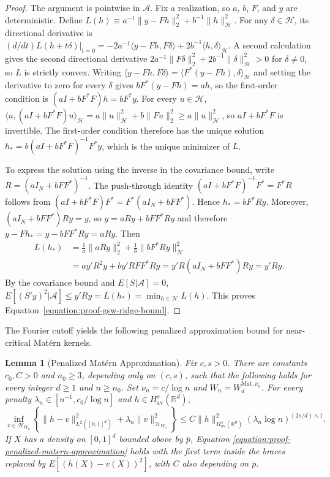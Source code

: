 \documentclass[letterpaper,12pt]{article}
\newtheorem{lem}[thm]{Lemma}
\theoremstyle{definition}
\numberwithin{equation}{section}
\newcommand{\mc}{\mathcal}
\newcommand{\norm}[1]{\lVert#1\rVert}
\begin{document}
\begin{proof}
The argument is pointwise in $\mathcal A$. Fix a realization, so $a$, $b$, $F$, and $y$ are deterministic.
Define $L(h)\equiv a^{-1}\norm{y-Fh}_2^2+b^{-1}\norm{h}_{\mathcal H}^2$. For any $\delta\in\mathcal H$, its directional derivative is $(d/dt)L(h+t\delta)|_{t=0}=-2a^{-1}\langle y-Fh,F\delta\rangle+2b^{-1}\langle h,\delta\rangle_{\mathcal H}$.
A second calculation gives the second directional derivative $2a^{-1}\norm{F\delta}_2^2+2b^{-1}\norm{\delta}_{\mathcal H}^2>0$ for $\delta\neq0$, so $L$ is strictly convex. Writing $\langle y-Fh,F\delta\rangle=\langle F^*(y-Fh),\delta\rangle_{\mathcal H}$ and setting the derivative to zero for every $\delta$ gives $bF^*(y-Fh)=ah$, so the first-order condition is $(aI+bF^*F)h=bF^*y$. For every $u\in\mathcal H$, $\langle u,(aI+bF^*F)u\rangle_{\mathcal H}=a\norm{u}_{\mathcal H}^2+b\norm{Fu}_2^2\geq a\norm{u}_{\mathcal H}^2$, so $aI+bF^*F$ is invertible. The first-order condition therefore has the unique solution $h_*=b(aI+bF^*F)^{-1}F^*y$, which is the unique minimizer of $L$.

To express the solution using the inverse in the covariance bound, write $R=(aI_N+bFF^*)^{-1}$. The push-through identity $(aI+bF^*F)^{-1}F^*=F^*R$ follows from $(aI+bF^*F)F^*=F^*(aI_N+bFF^*)$. Hence $h_*=bF^*Ry$. Moreover, $(aI_N+bFF^*)Ry=y$, so $y=aRy+bFF^*Ry$ and therefore $y-Fh_*=y-bFF^*Ry=aRy$.
Then
\begin{align*}
L(h_*)&=\frac1a\norm{aRy}_2^2+\frac1b\norm{bF^*Ry}_{\mathcal H}^2\\
&=ay'R^2y+by'RFF^*Ry=y'R(aI_N+bFF^*)Ry=y'Ry.
\end{align*}
By the covariance bound and $E[S|\mathcal A]=0$, $E[(S'y)^2|\mathcal A]\leq y'Ry=L(h_*)=\min_{h\in\mathcal H}L(h)$. This proves Equation~\eqref{equation:proof-gsw-ridge-bound}.
\end{proof}

The Fourier cutoff yields the following penalized approximation bound for near-critical Mat\'ern kernels.

\begin{lem}[Penalized Mat\'ern Approximation]\label{lemma:proof-penalized-matern-approximation}
Fix $c,s>0$.
There are constants $c_0,C>0$ and $n_0\geq3$, depending only on $(c,s)$, such that the following holds for every integer $d\geq1$ and $n\geq n_0$.
Set $\nu_n=c/\log n$ and $W_n=W_d^{\mathrm{Mat},\nu_n}$.
For every penalty $\lambda_n\in[n^{-1},c_0/\log n]$ and $h\in H_{\mathrm{av}}^s(\mathbb R^d)$,
\begin{equation}\label{equation:proof-penalized-matern-approximation}
\inf_{v\in\mc H_{W_n}}\left\{\norm{h-v}_{L^2([0,1]^d)}^2+\lambda_n\norm{v}_{\mc H_{W_n}}^2\right\}\leq C\norm{h}_{H_{\mathrm{av}}^s(\mathbb R^d)}^2(\lambda_n\log n)^{(2s/d)\wedge1}.
\end{equation}
If $X$ has a density on $[0,1]^d$ bounded above by $\overline p$, Equation \ref{equation:proof-penalized-matern-approximation} holds with the first term inside the braces replaced by $E[(h(X)-v(X))^2]$, with $C$ also depending on $\overline p$.
\end{lem}
\end{document}
